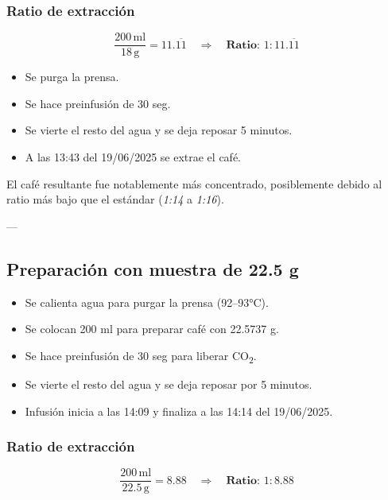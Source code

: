 \documentclass{article}
\begin{document}
\subsubsection*{Ratio de extracción}
\[
\frac{200 \, \text{ml}}{18 \, \text{g}} = 11.\overline{11} \quad \Rightarrow \quad \textbf{Ratio: } 1:11.\overline{11}
\]

\begin{itemize}
	\item Se purga la prensa.
	\item Se hace preinfusión de 30 seg.
	\item Se vierte el resto del agua y se deja reposar 5 minutos.
	\item A las 13:43 del 19/06/2025 se extrae el café.
\end{itemize}

El café resultante fue notablemente más concentrado, posiblemente debido al ratio más bajo que el estándar (\textit{1:14} a \textit{1:16}).

---

\subsection{Preparación con muestra de 22.5 g}

\begin{itemize}
	\item Se calienta agua para purgar la prensa (92–93°C).
	\item Se colocan 200 ml para preparar café con 22.5737 g.
	\item Se hace preinfusión de 30 seg para liberar CO\textsubscript{2}.
	\item Se vierte el resto del agua y se deja reposar por 5 minutos.
	\item Infusión inicia a las 14:09 y finaliza a las 14:14 del 19/06/2025.
\end{itemize}

\subsubsection*{Ratio de extracción}
\[
\frac{200 \, \text{ml}}{22.5 \, \text{g}} = 8.88 \quad \Rightarrow \quad \textbf{Ratio: } 1:8.88
\]





\printbibliography[heading=bibintoc]
\end{document}
